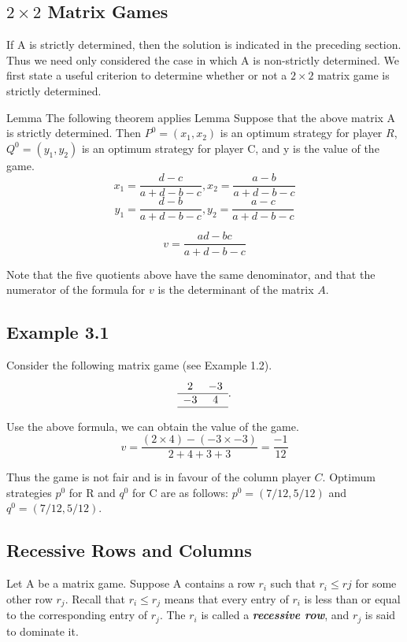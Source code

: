 \documentclass[]{report}
\begin{document}
\subsection{$2 \times 2$ Matrix Games}
If A is strictly determined, then the solution is indicated in the preceding section. Thus we
need only considered the case in which A is non-strictly determined.
We first state a useful criterion to determine whether or not a $2 \times 2$ matrix game is strictly determined.

Lemma
The following theorem applies
Lemma
Suppose that the above matrix A is strictly determined. Then $P^0 = (x_1,x_2)$ is an optimum strategy for player $R$, $Q^0 = (y_1,y_2)$ is an optimum strategy for player C, and y is the value of the game.
\[ x_1 = \frac{d-c}{a+d-b-c}, x_2 = \frac{a-b}{a+d-b-c}\]
\[ y_1 = \frac{d-b}{a+d-b-c}, y_2 = \frac{a-c}{a+d-b-c}\]

\[ v = \frac{ad-bc}{a+d-b-c} \]

Note that the five quotients above have the same denominator, and that the numerator of the formula for $v$ is the determinant of 
the matrix $A$.

\subsection*{Example 3.1}
Consider the following matrix game (see Example 1.2).
\[
\begin{array}{cc}
   2 & -3 \\ \hline
  -3 & 4 \\ \hline
\end{array}.
\]

Use the above formula, we can obtain the value of the game.
\[ v = \frac{(2\times4)-(-3 \times-3)}{2+4+3+3} = \frac{-1}{12} \]

Thus the game is not fair and is in favour of the column player $C$. Optimum strategies $p^0$ for R and $q^0$ for C are as follows:
$p^0 = (7/12,5/12)$ and $q^0 = (7/12,5/12)$.


\subsection{Recessive Rows and Columns}
Let A be a matrix game. Suppose A contains a row $r_i$ such that $r_i \leq rj$ for some other
row $r_j$.
Recall that $r_i\leq r_j$ means that every entry of $r_i$ is less than or equal to the corresponding entry of $r_j$.
The $r_i$ is called a \textbf{\textit{recessive row}}, and $r_j$ is said to dominate it.
\end{document}
